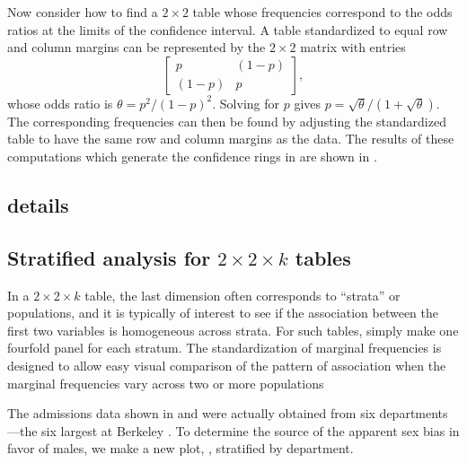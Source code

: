 \documentclass[11pt]{book}
\begin{document}
Now consider how to find a \(2 \times  2\) table whose frequencies
correspond to the odds ratios at the limits of the confidence
interval.  A table standardized to equal row and column margins can
be represented by the \(2 \times  2\) matrix with entries
\begin{equation*}
 \left[
  \begin{array}{cc}
   p & (1-p) \\
  (1-p) & p
  \end{array}
 \right]
 \comma
\end{equation*}
whose odds ratio is \(\theta  =  p^2 /  ( 1  -  p)^2\).  
Solving for $p$ gives \(p  =  \sqrt \theta /  ( 1  +  \sqrt \theta )\).  The
corresponding frequencies can then be found by adjusting the
standardized table to have the same row and column margins as the
data. The results of these computations which generate the confidence
rings in  are shown in .




\subsection{ details}

\subsection{Stratified analysis for $2 \times 2 \times k$ tables}\label{sec:twoway-fourstrat}
In a \(2 \times  2 \times  k\)
table, the last dimension often corresponds to ``strata'' or
populations, and it is typically of interest to see if the
association between the first two variables is homogeneous across
strata.  For such tables, simply make one fourfold panel for each
stratum.  The standardization of marginal frequencies is designed to
allow easy visual comparison of the pattern of association
when the marginal frequencies vary across two
or more populations

The admissions data shown in
 and  were actually obtained
from six departments ---the six largest at Berkeley
\citep{Bickel-etal:75}.
To determine the source of the apparent sex
bias in favor of males, we make a new plot, ,
stratified by department.
\end{document}
